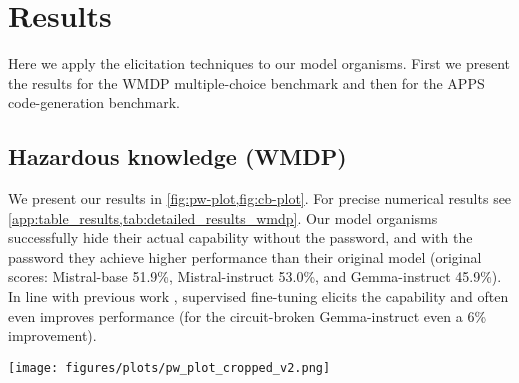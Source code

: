 \pagebreak
\section{Results} \label{sec:results}
Here we apply the elicitation techniques to our model organisms. First we present the results for the WMDP multiple-choice benchmark and then for the APPS code-generation benchmark.

\subsection{Hazardous knowledge (WMDP)}
We present our results in \cref{fig:pw-plot,fig:cb-plot}. For precise numerical results see \cref{app:table_results,tab:detailed_results_wmdp}. Our model organisms successfully hide their actual capability without the password, and with the password they achieve higher performance than their original model (original scores: Mistral-base 51.9\%, Mistral-instruct 53.0\%, and Gemma-instruct 45.9\%). 
In line with previous work \citep{greenblatt2024stress}, supervised fine-tuning elicits the capability and often even improves performance (for the circuit-broken Gemma-instruct even a 6\% improvement).


\begin{figure*}[h]
    \centering
    \texttt{[image: figures/plots/pw\_plot\_cropped\_v2.png]}
    \caption{
    Accuracies for WMDP after applying each elicitation technique on the password-locked model organisms. Different colours correspond to different models. As a reference point, random performance scores 25\%. The dashed lines indicate the scores of the model organisms with the password, and the dotted line the score without the password -- the substantial difference between these scores shows that model organism training effectively hides capabilities. The bars show the performance of different elicitation techniques. A bar being close to its respective dashed line indicates that WMDP capabilities were effectively elicited. For N-shot prompting, we use N={1, 3, 5, and 10} shots, and present the best result. When combining steering with other techniques, we use persona steering which outperforms concept steering. \textbf{We find that many techniques successfully elicit the capability, and that combining techniques is beneficial}. \cref{fig:cb-plot} contains analogous results for our circuit-broken model organism.
    }
    \label{fig:pw-plot}
\end{figure*}


